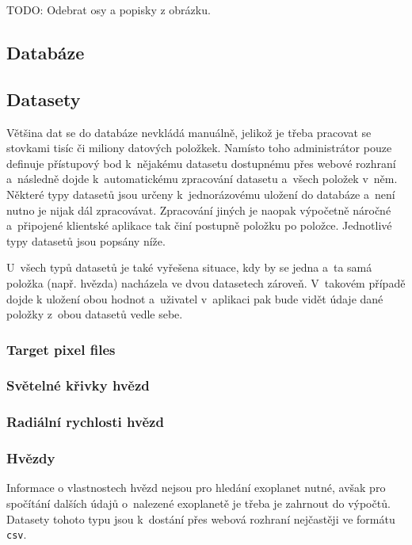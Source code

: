 \documentclass[a4paper,12pt]{article}
\def\code#1{\texttt{#1}}
\begin{document}
{{{{{{{{
TODO: Odebrat osy a popisky z obrázku.

\subsection{Databáze}

\subsection{Datasety}

Většina dat se do databáze nevkládá manuálně, jelikož je třeba pracovat se stovkami tisíc či miliony datových položkek. Namísto toho administrátor pouze definuje přístupový bod k~nějakému datasetu dostupnému přes webové rozhraní a~následně dojde k~automatickému zpracování datasetu a~všech položek v~něm. Některé typy datasetů jsou určeny k~jednorázovému uložení do databáze a~není nutno je nijak dál zpracovávat. Zpracování jiných je naopak výpočetně náročné a~připojené klientské aplikace tak činí postupně položku po položce. Jednotlivé typy datasetů jsou popsány níže.

U~všech typů datasetů je také vyřešena situace, kdy by se jedna a~ta samá položka (např. hvězda) nacházela ve dvou datasetech zároveň. V~takovém případě dojde k uložení obou hodnot a~uživatel v~aplikaci pak bude vidět údaje dané položky z~obou datasetů vedle sebe.

\subsubsection{Target pixel files}

\subsubsection{Světelné křivky hvězd}

\subsubsection{Radiální rychlosti hvězd}

\subsubsection{Hvězdy}

Informace o vlastnostech hvězd nejsou pro hledání exoplanet nutné, avšak pro spočítání dalších údajů o~nalezené exoplanetě je třeba je zahrnout do výpočtů. Datasety tohoto typu jsou k~dostání přes webová rozhraní nejčastěji ve formátu \code{csv}.

}}}}}}}}
\end{document}
